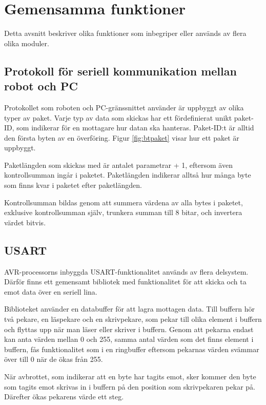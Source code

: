 \section{Gemensamma funktioner}
Detta avsnitt beskriver olika funktioner som inbegriper eller används av flera olika moduler.

\subsection{Protokoll för seriell kommunikation mellan robot och PC}
\label{sec:bt-protokoll}
Protokollet som roboten och PC-gränssnittet använder är uppbyggt av olika typer av paket. Varje typ av data som skickas har ett fördefinierat unikt paket-ID, som indikerar för en mottagare hur datan ska hanteras. Paket-ID:t är alltid den första byten av en överföring. Figur \ref{fig:btpaket} visar hur ett paket är uppbyggt.


Paketlängden som skickas med är antalet parametrar + 1, eftersom även kontrollsumman ingår i paketet. Paketlängden indikerar alltså hur många byte som finns kvar i paketet efter paketlängden.

Kontrollsumman bildas genom att summera värdena av alla bytes i paketet, exklusive kontrollsumman själv, trunkera summan till 8 bitar, och invertera värdet bitvis.

\subsection{USART}
\label{sec:usart}
AVR-processorns inbyggda USART-funktionalitet används av flera delsystem. Därför finns ett gemensamt bibliotek med funktionalitet för att skicka och ta emot data över en seriell lina.

Biblioteket använder en databuffer för att lagra mottagen data. Till buffern hör två pekare, en läspekare och en skrivpekare, som pekar till olika element i buffern och flyttas upp när man läser eller skriver i buffern. Genom att pekarna endast kan anta värden mellan 0 och 255, samma antal värden som det finns element i buffern, fås funktionalitet som i en ringbuffer eftersom pekarnas värden svämmar över till 0 när de ökas från 255.

När avbrottet, som indikerar att en byte har tagits emot, sker kommer den byte som tagits emot skrivas in i buffern på den position som skrivpekaren pekar på. Därefter ökas pekarens värde ett steg.

